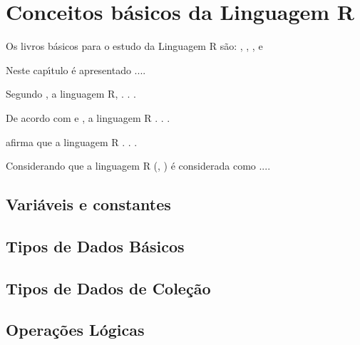 

\chapter{ Conceitos b\'{a}sicos da Linguagem R}

Os livros b\'{a}sicos para o estudo da Linguagem R s\~{a}o: \cite{Cotton2013}, \cite{Kabacoff2015}, \cite{Wickham2016}, e \cite{Lander2014}

Neste cap\'{\i}tulo \'{e} apresentado ....

Segundo \cite{Sebesta2018}, a linguagem R,  . . .

De acordo com \cite{Sebesta2018} e \cite{roy04}, a linguagem R . . .

\cite{Sebesta2018} afirma que a linguagem R . . .

Considerando que a linguagem R (\cite{Sebesta2018}, \cite{wat90}) \'{e} considerada como ....

    \section{Vari\'{a}veis e constantes}


    \section{Tipos de Dados B\'{a}sicos}

    \section{Tipos de Dados de Cole\c{c}\~{a}o}

    \section{Opera\c{c}\~{o}es L\'{o}gicas}



